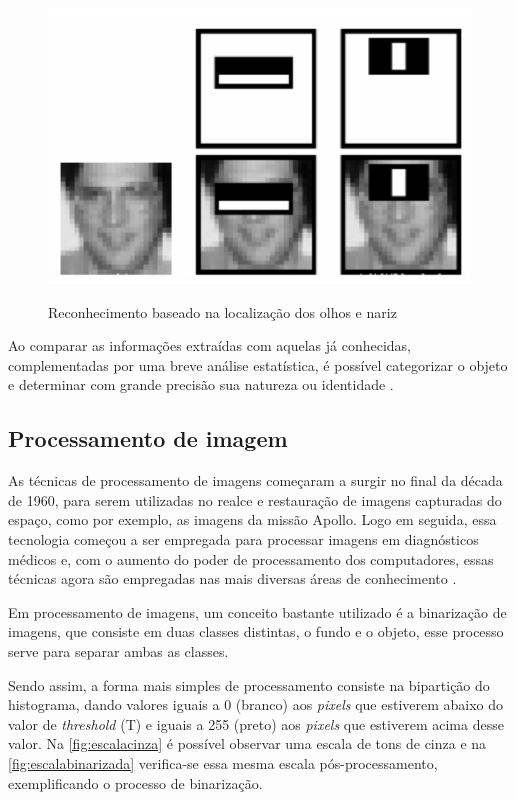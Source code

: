 \begin{figure}[h!]
    \centering
    \caption{Reconhecimento baseado na localização dos olhos e nariz}
    \includegraphics[scale=0.35]{figuras/haarcascate.png}
    \label{fig:haarcascate}
    \centering
\end{figure}

Ao comparar as informações extraídas com aquelas já conhecidas, 
complementadas por uma breve análise estatística, é possível 
categorizar o objeto e determinar com grande precisão sua natureza 
ou identidade \cite{gonzalez2010}.

\subsection{Processamento de imagem}\label{subsec:processamento}

As técnicas de processamento de imagens começaram a surgir no final da década de 1960, 
para serem utilizadas no realce e restauração de imagens capturadas do espaço, 
como por exemplo, as imagens da missão Apollo. Logo em seguida, essa tecnologia 
começou a ser empregada para processar imagens em diagnósticos médicos e, com 
o aumento do poder de processamento dos computadores, essas técnicas agora 
são empregadas nas mais diversas áreas de conhecimento \cite{gonzalez2010}.

Em processamento de imagens, um conceito bastante utilizado é a binarização de
imagens, que consiste em duas classes distintas, o fundo e o objeto, esse processo 
serve para separar ambas as classes.

Sendo assim, a forma mais simples de processamento consiste na
bipartição do histograma, dando valores iguais a 0 (branco) aos \textit{pixels} que estiverem
abaixo do valor de \textit{threshold} (T) e iguais a 255 (preto) aos \textit{pixels} que estiverem 
acima desse valor. Na \autoref{fig:escalacinza} é possível observar uma escala de 
tons de cinza e na \autoref{fig:escalabinarizada} verifica-se essa mesma escala 
pós-processamento, exemplificando o processo de binarização.

